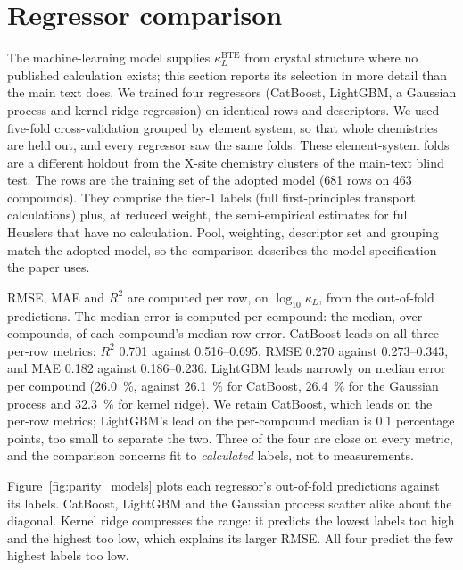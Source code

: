 \documentclass[preprint, 12pt]{elsarticle}
\begin{document}
\section{Regressor comparison}
\label{sec:smodel}

The machine-learning model supplies $\kappa_L^{\mathrm{BTE}}$ from crystal structure where no
published calculation exists; this section reports its selection in more detail than the main text
does. We trained four regressors (CatBoost, LightGBM, a Gaussian process and kernel ridge
regression) on identical rows and descriptors. We used five-fold cross-validation grouped by element
system, so that whole chemistries are held out, and every regressor saw the same folds. These
element-system folds are a different holdout from the X-site chemistry clusters of the main-text
blind test. The rows are the training set of the adopted model (\num{681} rows on \num{463} compounds). They
comprise the tier-1 labels (full first-principles transport calculations) plus, at reduced weight,
the semi-empirical estimates for full Heuslers that have no calculation. Pool, weighting, descriptor
set and grouping match the adopted model, so the comparison describes the model specification the
paper uses.

RMSE, MAE and $R^2$ are computed per row, on $\log_{10}\kappa_L$, from the out-of-fold predictions.
The median error is computed per compound: the median, over compounds, of each compound's median row
error. CatBoost leads on all three per-row metrics: $R^2$ \num{0.701} against
\numrange{0.516}{0.695}, RMSE \num{0.270} against \numrange{0.273}{0.343}, and MAE \num{0.182}
against \numrange{0.186}{0.236}. LightGBM leads narrowly on median error per compound
(\SI{26.0}{\percent}, against \SI{26.1}{\percent} for CatBoost, \SI{26.4}{\percent} for the Gaussian
process and \SI{32.3}{\percent} for kernel ridge). We retain CatBoost, which leads on the per-row
metrics; LightGBM's lead on the per-compound median is \num{0.1} percentage points, too small to
separate the two. Three of the four are close on every metric, and the comparison concerns fit to
\emph{calculated} labels, not to measurements.

Figure~\ref{fig:parity_models} plots each regressor's out-of-fold predictions against its labels.
CatBoost, LightGBM and the Gaussian process scatter alike about the diagonal. Kernel ridge
compresses the range: it predicts the lowest labels too high and the highest too low, which explains
its larger RMSE. All four predict the few highest labels too low.
\end{document}
